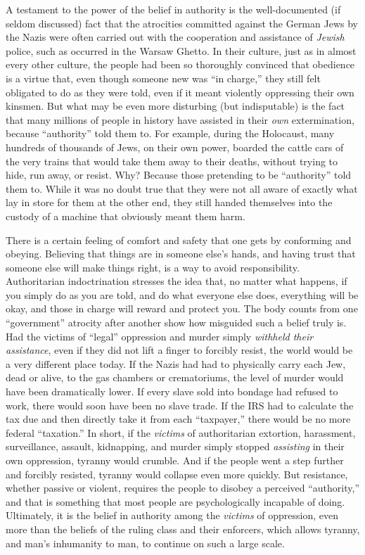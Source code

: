 \documentclass{book}
\begin{document}
A testament to the power of the belief in authority is the well-documented (if seldom discussed) fact that the atrocities committed against the German Jews by the Nazis were often carried out with the cooperation and assistance of \emph{Jewish} police, such as occurred in the Warsaw Ghetto. In their culture, just as in almost every other culture, the people had been so thoroughly convinced that obedience is a virtue that, even though someone new was \enquote{in charge,} they still felt obligated to do as they were told, even if it meant violently oppressing their own kinsmen. But what may be even more disturbing (but indisputable) is the fact that many millions of people in history have assisted in their \emph{own} extermination, because \enquote{authority} told them to. For example, during the Holocaust, many hundreds of thousands of Jews, on their own power, boarded the cattle cars of the very trains that would take them away to their deaths, without trying to hide, run away, or resist. Why? Because those pretending to be \enquote{authority} told them to. While it was no doubt true that they were not all aware of exactly what lay in store for them at the other end, they still handed themselves into the custody of a machine that obviously meant them harm.

There is a certain feeling of comfort and safety that one gets by conforming and obeying. Believing that things are in someone else's hands, and having trust that someone else will make things right, is a way to avoid responsibility. Authoritarian indoctrination stresses the idea that, no matter what happens, if you simply do as you are told, and do what everyone else does, everything will be okay, and those in charge will reward and protect you. The body counts from one \enquote{government} atrocity after another show how misguided such a belief truly is. Had the victims of \enquote{legal} oppression and murder simply \emph{withheld their assistance}, even if they did not lift a finger to forcibly resist, the world would be a very different place today. If the Nazis had had to physically carry each Jew, dead or alive, to the gas chambers or crematoriums, the level of murder would have been dramatically lower. If every slave sold into bondage had refused to work, there would soon have been no slave trade. If the IRS had to calculate the tax due and then directly take it from each \enquote{taxpayer,} there would be no more federal \enquote{taxation.} In short, if the \emph{victims} of authoritarian extortion, harassment, surveillance, assault, kidnapping, and murder simply stopped \emph{assisting} in their own oppression, tyranny would crumble. And if the people went a step further and forcibly resisted, tyranny would collapse even more quickly. But resistance, whether passive or violent, requires the people to disobey a perceived \enquote{authority,} and that is something that most people are psychologically incapable of doing. Ultimately, it is the belief in authority among the \emph{victims} of oppression, even more than the beliefs of the ruling class and their enforcers, which allows tyranny, and man's inhumanity to man, to continue on such a large scale.
\end{document}
